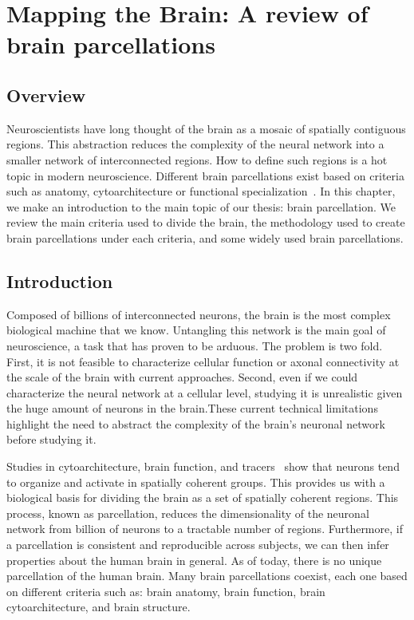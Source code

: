 \chapter{Mapping the Brain: A review of brain parcellations}
\label{ch:brain_mapping}

\section{Overview}
Neuroscientists have long thought of the brain as a mosaic of spatially contiguous
regions. This abstraction reduces the complexity of the neural network into a smaller
network of interconnected regions. How to define such regions is a hot topic
in modern neuroscience. Different brain parcellations exist based on criteria
such as anatomy, cytoarchitecture or functional specialization~\cite{Brodmann1909, Collins1998, Yeo2011}.
In this chapter, we make an introduction to the main topic of our thesis: brain
parcellation. We review the main criteria used to divide the brain, the methodology
used to create brain parcellations under each criteria, and some widely used
brain parcellations.

\section{Introduction}
Composed of billions of interconnected neurons, the brain is the most complex
biological machine that we know. Untangling this network is the main goal of
neuroscience, a task that has proven to be arduous. The problem is two fold.
First, it is not feasible to characterize cellular function or axonal
connectivity at the scale of the brain with current approaches. Second, even if
we could characterize the neural network at a cellular level, studying it is
unrealistic given the huge amount of neurons in the brain.These current technical
limitations highlight the need to abstract the complexity of the brain's neuronal
network before studying it.

Studies in cytoarchitecture\cite{Meynert1872, Brodmann1909, VonEconomo1925}, brain
function\cite{Penfield1954, VonderMalsburg1994}, and tracers~\cite{Schmahmann2006, Stephan2013}
show that neurons tend to organize and activate in spatially coherent groups.
This provides us with a biological basis for dividing the brain as a set of spatially
coherent regions. This process, known as parcellation, reduces the dimensionality
of the neuronal network from billion of neurons to a tractable number of regions.
Furthermore, if a parcellation is consistent and reproducible across subjects,
we can then infer properties about the human brain in general. As of today,
there is no unique parcellation of the human brain. Many brain parcellations
coexist, each one based on different criteria such as: brain anatomy, brain
function, brain cytoarchitecture, and brain structure. 

